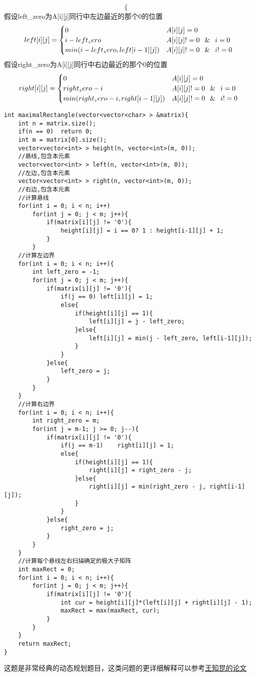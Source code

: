 \begin{description}
$$\begin{cases}
\end{cases}
$$
假设left\_zero为A[i][j]同行中左边最近的那个0的位置
$$
left[i][j] =
\begin{cases} 
0 & A[i][j] = 0  \\
i - left_zero & A[i][j] != 0 \,\And\, i = 0 \\
min(i - left_zero, left[i-1][j]) & A[i][j] != 0 \,\And\, i != 0 \\
\end{cases}
$$
假设right\_zero为A[i][j]同行中右边最近的那个0的位置
$$
right[i][j] =
\begin{cases} 
0 & A[i][j] = 0  \\
right_zero - i & A[i][j] != 0 \,\And\, i = 0 \\
min(right_zero - i, right[i-1][j]) & A[i][j] != 0 \,\And\, i != 0 \\
\end{cases}
$$
    \begin{lstlisting}
int maximalRectangle(vector<vector<char> > &matrix){ 
	int n = matrix.size();
	if(n == 0)	return 0;
	int m = matrix[0].size();
	vector<vector<int> > height(n, vector<int>(m, 0)); 
	//悬线,包含本元素
	vector<vector<int> > left(n, vector<int>(m, 0)); 
	//左边,包含本元素
	vector<vector<int> > right(n, vector<int>(m, 0)); 
	//右边,包含本元素
	//计算悬线
	for(int i = 0; i < n; i++)
		for(int j = 0; j < m; j++){
			if(matrix[i][j] != '0'){
				height[i][j] = i == 0? 1 : height[i-1][j] + 1;
			}
		}
	//计算左边界
	for(int i = 0; i < n; i++){
		int left_zero = -1;
		for(int j = 0; j < m; j++){
			if(matrix[i][j] != '0'){
				if(j == 0) left[i][j] = 1;
				else{
					if(height[i][j] == 1){
						left[i][j] = j - left_zero;
					}else{
						left[i][j] = min(j - left_zero, left[i-1][j]);
					}
				}
			}else{
				left_zero = j;
			}
		}
	}
	//计算右边界
	for(int i = 0; i < n; i++){
		int right_zero = m;
		for(int j = m-1; j >= 0; j--){
			if(matrix[i][j] != '0'){
				if(j == m-1)	right[i][j] = 1;
				else{
					if(height[i][j] == 1){
						right[i][j] = right_zero - j;
					}else{
						right[i][j] = min(right_zero - j, right[i-1][j]);
					}
				}
			}else{
				right_zero = j;
			}
		}
	}
	//计算每个悬线左右扫描确定的极大子矩阵
	int maxRect = 0;
	for(int i = 0; i < n; i++){
		for(int j = 0; j < m; j++){
			if(matrix[i][j] != '0'){
				int cur = height[i][j]*(left[i][j] + right[i][j] - 1);
				maxRect = max(maxRect, cur);
			}
		}
	}
	return maxRect;
}
    \end{lstlisting}
    这题是非常经典的动态规划题目，这类问题的更详细解释可以参考\href{http://wenku.baidu.com/link?url=8ks5PMqZkgKmnRCvK2\_o-jbvRekmySiy\_jPWLj9AJsDKU\_5zRftwE7pQQcI\_4i1NJw5OTdk9QeyYYh5\_rrb9FjZ3JnHnCOLJhVLVY60tfKy}{王知昆的论文}
\end{description}

